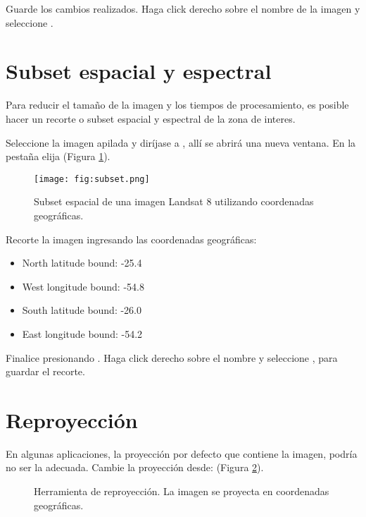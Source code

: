 Guarde los cambios realizados. Haga click derecho sobre el nombre de la imagen y seleccione .

\section{Subset espacial y espectral}
Para reducir el tamaño de la imagen y los tiempos de procesamiento, es posible hacer un recorte o subset espacial y espectral de la zona de interes.

Seleccione la imagen apilada y diríjase a , allí se abrirá una nueva ventana. En la pestaña  elija  (Figura \ref{fig:subset}).

\begin{figure}[h!]
    \centering
    \texttt{[image: fig:subset.png]}
    \caption{Subset espacial de una imagen Landsat 8 utilizando coordenadas geográficas.}
    \label{fig:subset}
\end{figure}

Recorte la imagen ingresando las coordenadas geográficas:

\begin{itemize}
    \item North latitude bound: -25.4
    \item West longitude bound: -54.8
    \item South latitude bound: -26.0
    \item East longitude bound: -54.2
\end{itemize}

Finalice presionando . Haga click derecho sobre el nombre y seleccione  , para guardar el recorte.



\section{Reproyección}
En algunas aplicaciones, la proyección por defecto que contiene la imagen, podría no ser la adecuada. Cambie la proyección desde:  (Figura \ref{fig:repro}). 

\begin{figure}[h!]
    \centering
    \hspace{1cm}
    \caption{Herramienta de reproyección. La imagen se proyecta en coordenadas geográficas.}
    \label{fig:repro}
\end{figure}

